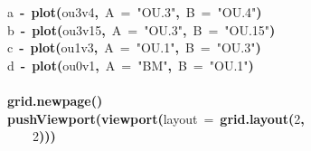 \documentclass{elsarticle}
\makeatletter
\newcommand{\hlnumber}[1]{\textcolor[rgb]{0,0,0}{#1}}%
\newcommand{\hlfunctioncall}[1]{\textcolor[rgb]{.5,0,.33}{\textbf{#1}}}%
\newcommand{\hlstring}[1]{\textcolor[rgb]{.6,.6,1}{#1}}%
\newcommand{\hlkeyword}[1]{\textbf{#1}}%
\newcommand{\hlargument}[1]{\textcolor[rgb]{.69,.25,.02}{#1}}%
\newcommand{\hlassignement}[1]{\textbf{#1}}%
\newcommand{\hlsymbol}[1]{#1}%
\newcommand{\hlstd}[1]{\textcolor[rgb]{0,0,0}{#1}}%
\newenvironment{kframe}{%
 \def\FrameCommand##1{\hskip\@totalleftmargin \hskip-\fboxsep
 \colorbox{shadecolor}{##1}\hskip-\fboxsep
     \hskip-\linewidth \hskip-\@totalleftmargin \hskip\columnwidth}%
 \MakeFramed {\advance\hsize-\width
   \@totalleftmargin\z@ \linewidth\hsize
   \@setminipage}}%
 {\par\unskip\endMakeFramed}
\newenvironment{knitrout}{}{} %
\makeatother
\begin{document}
\begin{figure}
\begin{center}
\begin{knitrout}
\color{fgcolor}\begin{kframe}
\begin{flushleft}
\ttfamily\noindent
\hlsymbol{a}{\ }\hlassignement{\usebox{\hlnormalsizeboxlessthan}-}{\ }\hlfunctioncall{plot}\hlkeyword{(}\hlsymbol{ou3v4}\hlkeyword{,}{\ }\hlargument{A}{\ }\hlargument{=}{\ }\hlstring{"{}OU.3"{}}\hlkeyword{,}{\ }\hlargument{B}{\ }\hlargument{=}{\ }\hlstring{"{}OU.4"{}}\hlkeyword{)}\hspace*{\fill}\\
\hlstd{}\hlsymbol{b}{\ }\hlassignement{\usebox{\hlnormalsizeboxlessthan}-}{\ }\hlfunctioncall{plot}\hlkeyword{(}\hlsymbol{ou3v15}\hlkeyword{,}{\ }\hlargument{A}{\ }\hlargument{=}{\ }\hlstring{"{}OU.3"{}}\hlkeyword{,}{\ }\hlargument{B}{\ }\hlargument{=}{\ }\hlstring{"{}OU.15"{}}\hlkeyword{)}\hspace*{\fill}\\
\hlstd{}\hlsymbol{c}{\ }\hlassignement{\usebox{\hlnormalsizeboxlessthan}-}{\ }\hlfunctioncall{plot}\hlkeyword{(}\hlsymbol{ou1v3}\hlkeyword{,}{\ }\hlargument{A}{\ }\hlargument{=}{\ }\hlstring{"{}OU.1"{}}\hlkeyword{,}{\ }\hlargument{B}{\ }\hlargument{=}{\ }\hlstring{"{}OU.3"{}}\hlkeyword{)}\hspace*{\fill}\\
\hlstd{}\hlsymbol{d}{\ }\hlassignement{\usebox{\hlnormalsizeboxlessthan}-}{\ }\hlfunctioncall{plot}\hlkeyword{(}\hlsymbol{ou0v1}\hlkeyword{,}{\ }\hlargument{A}{\ }\hlargument{=}{\ }\hlstring{"{}BM"{}}\hlkeyword{,}{\ }\hlargument{B}{\ }\hlargument{=}{\ }\hlstring{"{}OU.1"{}}\hlkeyword{)}\hspace*{\fill}\\
\hlstd{}\hspace*{\fill}\\
\hlstd{}\hlfunctioncall{grid.newpage}\hlkeyword{(}\hlkeyword{)}\hspace*{\fill}\\
\hlstd{}\hlfunctioncall{pushViewport}\hlkeyword{(}\hlfunctioncall{viewport}\hlkeyword{(}\hlargument{layout}{\ }\hlargument{=}{\ }\hlfunctioncall{grid.layout}\hlkeyword{(}\hlnumber{2}\hlkeyword{,}\hspace*{\fill}\\
\hlstd{}{\ }{\ }{\ }{\ }\hlnumber{2}\hlkeyword{)}\hlkeyword{)}\hlkeyword{)}\hspace*{\fill}\\

\end{flushleft}
\end{kframe}
\end{knitrout}
\end{center}
\end{figure}
\end{document}
